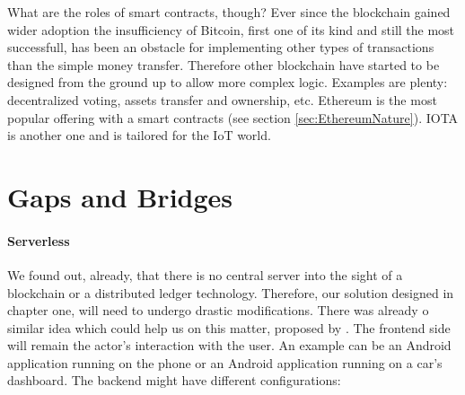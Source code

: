\documentclass[a4paper,12pt,twoside]{book}
\begin{document}
    What are the roles of smart contracts, though? Ever since the blockchain gained wider adoption the insufficiency of Bitcoin, first one of its kind and still the most successfull, has been an obstacle for implementing other types of transactions than the simple money transfer. Therefore other blockchain have started to be designed from the ground up to allow more complex logic. Examples are plenty: decentralized voting, assets transfer and ownership, etc. Ethereum is the most popular offering with a smart contracts (see section \ref{sec:EthereumNature}). IOTA is another one and is tailored for the IoT world.




\section{Gaps and Bridges}
\label{sec:GapsBridges}

    \paragraph{Serverless} We found out, already, that there is no central server into the sight of a blockchain or a distributed ledger technology. Therefore, our solution designed in chapter one, will need to undergo drastic modifications. There was already o similar idea which could help us on this matter, proposed by \cite{ApproachesToFrontEnd}. The frontend side will remain the actor's interaction with the user. An example can be an Android application running on the phone or an Android application running on a car's dashboard. The backend might have different configurations:
\end{document}
